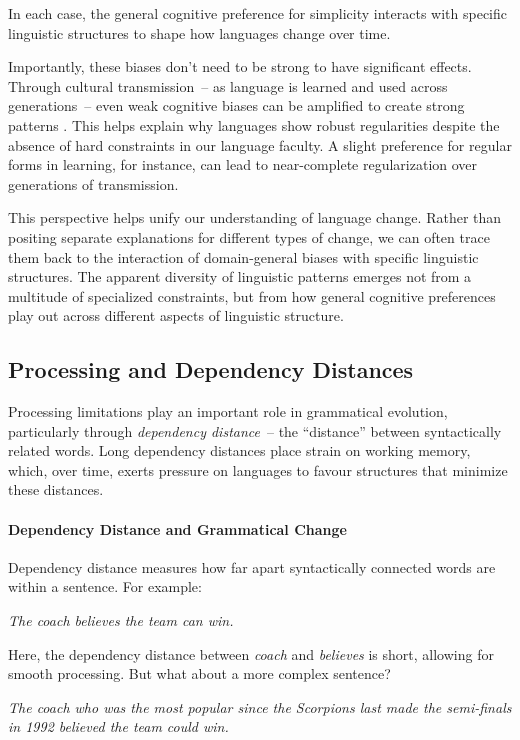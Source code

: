 In each case, the general cognitive preference for simplicity interacts with specific linguistic structures to shape how languages change over time.

Importantly, these biases don't need to be strong to have significant effects. Through cultural transmission~-- as language is learned and used across generations~-- even weak cognitive biases can be amplified to create strong patterns \citep{culbertson2016simplicity}. This helps explain why languages show robust regularities despite the absence of hard constraints in our language faculty. A slight preference for regular forms in learning, for instance, can lead to near-complete regularization over generations of transmission.

This perspective helps unify our understanding of language change. Rather than positing separate explanations for different types of change, we can often trace them back to the interaction of domain-general biases with specific linguistic structures. The apparent diversity of linguistic patterns emerges not from a multitude of specialized constraints, but from how general cognitive preferences play out across different aspects of linguistic structure.

\subsection{Processing and Dependency Distances}

Processing limitations play an important role in grammatical evolution, particularly through \textit{dependency distance}~-- the ``distance'' between syntactically related words. Long dependency distances place strain on working memory, which, over time, exerts pressure on languages to favour structures that minimize these distances.

\paragraph*{Dependency Distance and Grammatical Change}

Dependency distance measures how far apart syntactically connected words are within a sentence. For example:

\ea
\textit{The coach believes the team can win.}
\z

Here, the dependency distance between \textit{coach} and \textit{believes} is short, allowing for smooth processing. But what about a more complex sentence?

\ea
\textit{The coach who was the most popular since the Scorpions last made the semi-finals in 1992 believed the team could win.}
\z

